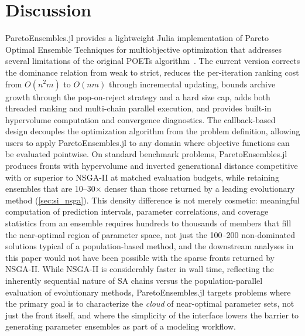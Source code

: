 \documentclass[preprint,review,12pt]{elsarticle}
\begin{document}
\section{Discussion}\label{sec:discussion}
ParetoEnsembles.jl provides a lightweight Julia implementation of Pareto Optimal Ensemble Techniques for multiobjective optimization that addresses several limitations of the original POETs algorithm~\cite{Song2010,Bassen2016}.
The current version corrects the dominance relation from weak to strict, reduces the per-iteration ranking cost from $O(n^2 m)$ to $O(nm)$ through incremental updating, bounds archive growth through the pop-on-reject strategy and a hard size cap, adds both threaded ranking and multi-chain parallel execution, and provides built-in hypervolume computation and convergence diagnostics.
The callback-based design decouples the optimization algorithm from the problem definition, allowing users to apply ParetoEnsembles.jl to any domain where objective functions can be evaluated pointwise.
On standard benchmark problems, ParetoEnsembles.jl produces fronts with hypervolume and inverted generational distance competitive with or superior to NSGA-II at matched evaluation budgets, while retaining ensembles that are 10--30$\times$ denser than those returned by a leading evolutionary method (\cref{sec:si_nsga}).
This density difference is not merely cosmetic: meaningful computation of prediction intervals, parameter correlations, and coverage statistics from an ensemble requires hundreds to thousands of members that fill the near-optimal region of parameter space, not just the 100--200 non-dominated solutions typical of a population-based method, and the downstream analyses in this paper would not have been possible with the sparse fronts returned by NSGA-II.
While NSGA-II is considerably faster in wall time, reflecting the inherently sequential nature of SA chains versus the population-parallel evaluation of evolutionary methods, ParetoEnsembles.jl targets problems where the primary goal is to characterize the \emph{cloud} of near-optimal parameter sets, not just the front itself, and where the simplicity of the interface lowers the barrier to generating parameter ensembles as part of a modeling workflow.
\end{document}
